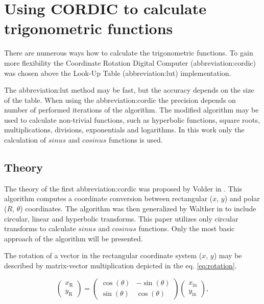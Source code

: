 \documentclass[a4paper, twoside, 11pt]{article}
\begin{document}
\section{Using CORDIC to calculate trigonometric functions}\label{sec:using-cordic-to-calculate-trigonometric-functions}
    There are numerous ways how to calculate the trigonometric functions. To gain more flexibility the Coordinate Rotation Digital Computer (\gls{abbreviation:cordic}) was chosen above the Look-Up Table (\gls{abbreviation:lut}) implementation.\par
    The \gls{abbreviation:lut} method may be fast, but the accuracy depends on the size of the table. When using the \gls{abbreviation:cordic} the precision depends on number of performed iterations of the algorithm. The modified algorithm may be used to calculate non-trivial functions, such as hyperbolic functions, square roots, multiplications, divisions, exponentials and logarithms. \cite{base-digital-signal-processing-with-field-programmable-gate-arrays} In this work only the calculation of $sinus$ and $cosinus$ functions is used.
    \subsection{Theory}\label{subsec:cordic-theory}
        The theory of the first \gls{abbreviation:cordic} was proposed by Volder in \cite{volder-cordic-trigonomtric-computing-technique}. This algorithm computes a coordinate conversion between rectangular ($x$, $y$) and polar ($R$, $\theta$) coordinates. The algorithm was then generalized by Walther in \cite{walther-a-unified-algorithm-for-elementary-functions} to include circular, linear and hyperbolic transforms. This paper utilizes only circular transforms to calculate $sinus$ and $cosinus$ functions. Only the most basic approach of the algorithm will be presented.\par
        The rotation of a vector in the rectangular coordinate system ($x$, $y$) may be described by matrix-vector multiplication depicted in the eq. \ref{eq:rotation}.

        \begin{equation}\label{eq:rotation}
             \begin{pmatrix}
                 x_\text{R}\\
                 y_\text{R}
             \end{pmatrix}
             =
             \begin{pmatrix}
                 \cos (\theta) & -\sin (\theta)\\
                 \sin (\theta) & \cos (\theta)
             \end{pmatrix}
             \begin{pmatrix}
                 x_\text{in}\\
                 y_\text{in}
             \end{pmatrix},
        \end{equation}
\end{document}
